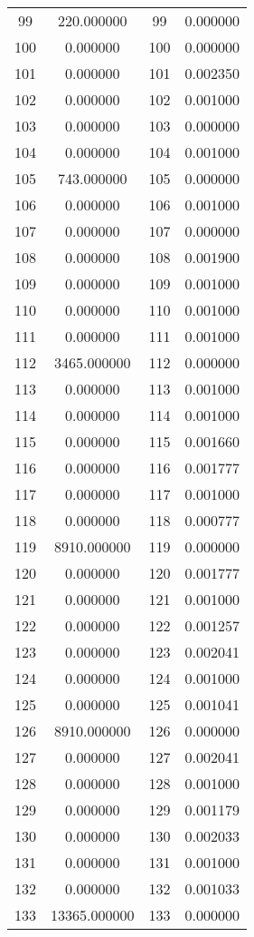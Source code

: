\documentclass[12pt]{article}
\begin{document}
\begin{longtable}{@{}cccc@{}}
99 & 220.000000 & 99 & 0.000000 \\
100 & 0.000000 & 100 & 0.000000 \\
101 & 0.000000 & 101 & 0.002350 \\
102 & 0.000000 & 102 & 0.001000 \\
103 & 0.000000 & 103 & 0.000000 \\
104 & 0.000000 & 104 & 0.001000 \\
105 & 743.000000 & 105 & 0.000000 \\
106 & 0.000000 & 106 & 0.001000 \\
107 & 0.000000 & 107 & 0.000000 \\
108 & 0.000000 & 108 & 0.001900 \\
109 & 0.000000 & 109 & 0.001000 \\
110 & 0.000000 & 110 & 0.001000 \\
111 & 0.000000 & 111 & 0.001000 \\
112 & 3465.000000 & 112 & 0.000000 \\
113 & 0.000000 & 113 & 0.001000 \\
114 & 0.000000 & 114 & 0.001000 \\
115 & 0.000000 & 115 & 0.001660 \\
116 & 0.000000 & 116 & 0.001777 \\
117 & 0.000000 & 117 & 0.001000 \\
118 & 0.000000 & 118 & 0.000777 \\
119 & 8910.000000 & 119 & 0.000000 \\
120 & 0.000000 & 120 & 0.001777 \\
121 & 0.000000 & 121 & 0.001000 \\
122 & 0.000000 & 122 & 0.001257 \\
123 & 0.000000 & 123 & 0.002041 \\
124 & 0.000000 & 124 & 0.001000 \\
125 & 0.000000 & 125 & 0.001041 \\
126 & 8910.000000 & 126 & 0.000000 \\
127 & 0.000000 & 127 & 0.002041 \\
128 & 0.000000 & 128 & 0.001000 \\
129 & 0.000000 & 129 & 0.001179 \\
130 & 0.000000 & 130 & 0.002033 \\
131 & 0.000000 & 131 & 0.001000 \\
132 & 0.000000 & 132 & 0.001033 \\
133 & 13365.000000 & 133 & 0.000000 \\

\end{longtable}
\end{document}
